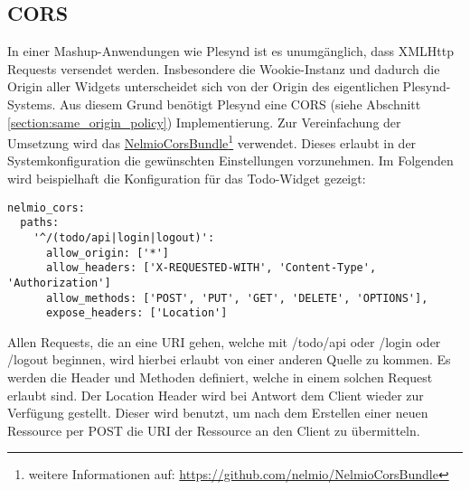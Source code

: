\subsection{\ac{CORS}}\label{section:cors_implementierung}
In einer Mashup-Anwendungen wie Plesynd ist es unumgänglich, dass XMLHttp Requests versendet werden. Insbesondere die Wookie-Instanz und dadurch die Origin aller Widgets unterscheidet sich von der Origin des eigentlichen Plesynd-Systems. Aus diesem Grund benötigt Plesynd eine \ac{CORS} (siehe Abschnitt \ref{section:same_origin_policy}) Implementierung. Zur Vereinfachung der Umsetzung wird das \href{https://github.com/nelmio/NelmioCorsBundle}{NelmioCorsBundle}\footnote{weitere Informationen auf: \url{https://github.com/nelmio/NelmioCorsBundle}} verwendet. Dieses erlaubt in der Systemkonfiguration die gewünschten Einstellungen vorzunehmen. Im Folgenden wird beispielhaft die Konfiguration für das Todo-Widget gezeigt: 
\begin{lstlisting}
nelmio_cors:
  paths:
    '^/(todo/api|login|logout)':
      allow_origin: ['*']
      allow_headers: ['X-REQUESTED-WITH', 'Content-Type', 'Authorization']
      allow_methods: ['POST', 'PUT', 'GET', 'DELETE', 'OPTIONS'],
      expose_headers: ['Location']
\end{lstlisting}
Allen Requests, die an eine \ac{URI} gehen, welche mit /todo/api oder /login oder /logout beginnen, wird hierbei erlaubt von einer anderen Quelle zu kommen. Es werden die Header und Methoden definiert, welche in einem solchen Request erlaubt sind. Der Location Header wird bei Antwort dem Client wieder zur Verfügung gestellt. Dieser wird benutzt, um nach dem Erstellen einer neuen Ressource per POST die \ac{URI} der Ressource an den Client zu übermitteln. 

